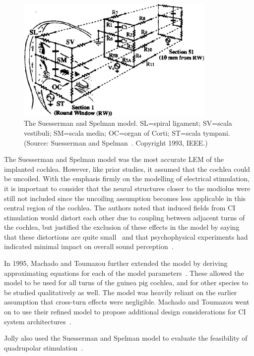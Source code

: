 \begin{figure}
	\centering
	\includegraphics[height=6cm]{Background/suesserman}
	\caption[The Suesserman and Spelman model]{The Suesserman and Spelman
	model. SL=spiral ligament; SV=scala vestibuli; SM=scala media; OC=organ of
	Corti; ST=scala tympani. (Source: Suesserman and
	Spelman~\cite{suesserman1993}. Copyright \textcopyright{} 1993, IEEE.)}
	\label{fig:model_suesserman}
\end{figure}

The Suesserman and Spelman model was the most accurate LEM of the implanted
cochlea. However, like prior studies, it assumed that the cochlea could be
uncoiled. With the emphasis firmly on the modelling of electrical stimulation,
it is important to consider that the neural structures closer to the modiolus
were still not included since the uncoiling assumption becomes less applicable
in this central region of the cochlea. The authors noted that induced fields
from CI stimulation would distort each other due to coupling between adjacent
turns of the cochlea, but justified the exclusion of these effects in the model
by saying that these distortions are quite small~\cite{girzon1987} and that
psychophysical experiments had indicated minimal impact on overall sound
perception~\cite{townshend1987}.

In 1995, Machado and Toumazou further extended the model by deriving
approximating equations for each of the model parameters~\cite{machado1995}.
These allowed the model to be used for all turns of the guinea pig cochlea, and
for other species to be studied qualitatively as well.
The model was heavily reliant on the earlier assumption that cross-turn effects
were negligible. Machado and Toumazou went on to use their refined model to
propose additional design considerations for CI system
architectures~\cite{machado1996}.

Jolly also used the Suesserman and Spelman model to evaluate the feasibility of
quadrupolar stimulation~\cite{jolly1996}.

